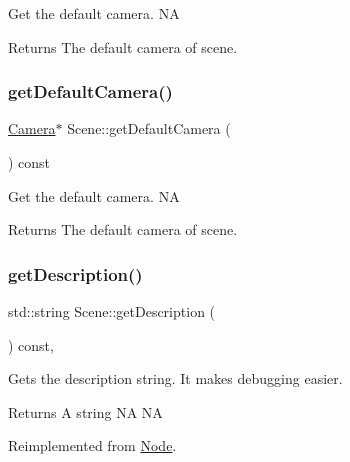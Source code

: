 Get the default camera.  NA \begin{DoxyReturn}{Returns}
The default camera of scene. 
\end{DoxyReturn}
\mbox{\label{classScene_a3c0cfe939da06f1ffe9a5ad9914bbde4}} 
\subsubsection{\texorpdfstring{get\+Default\+Camera()}{getDefaultCamera()}\hspace{0.1cm}{\footnotesize\ttfamily [2/2]}}
{\footnotesize\ttfamily \hyperlink{classCamera}{Camera}$\ast$ Scene\+::get\+Default\+Camera (\begin{DoxyParamCaption}{ }\end{DoxyParamCaption}) const\hspace{0.3cm}{\ttfamily [inline]}}

Get the default camera.  NA \begin{DoxyReturn}{Returns}
The default camera of scene. 
\end{DoxyReturn}
\mbox{\label{classScene_a81381e50c3ae90f1f5f02ca2ef1c7158}} 
\subsubsection{\texorpdfstring{get\+Description()}{getDescription()}\hspace{0.1cm}{\footnotesize\ttfamily [1/2]}}
{\footnotesize\ttfamily std\+::string Scene\+::get\+Description (\begin{DoxyParamCaption}{ }\end{DoxyParamCaption}) const\hspace{0.3cm}{\ttfamily [override]}, {\ttfamily [virtual]}}

Gets the description string. It makes debugging easier. \begin{DoxyReturn}{Returns}
A string  NA  NA 
\end{DoxyReturn}


Reimplemented from \hyperlink{classNode_a41710375a0d92a4ee54c39fe123b5912}{Node}.

\mbox{\label{classScene_a072cf51850bc3ec24da49d338c202fe1}} 
